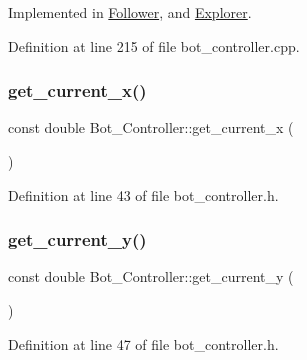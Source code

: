 Implemented in \hyperlink{class_follower_a0af597b7d7f416c37d85be69377d0b58}{Follower}, and \hyperlink{class_explorer_a38e04dc019525baca8530b6cf3e779de}{Explorer}.



Definition at line 215 of file bot\+\_\+controller.\+cpp.

\mbox{\label{class_bot___controller_a2efd33efbb2d3c8caa52e04a049b5971}} 
\subsubsection{\texorpdfstring{get\+\_\+current\+\_\+x()}{get\_current\_x()}}
{\footnotesize\ttfamily const double Bot\+\_\+\+Controller\+::get\+\_\+current\+\_\+x (\begin{DoxyParamCaption}{ }\end{DoxyParamCaption})\hspace{0.3cm}{\ttfamily [inline]}}



Definition at line 43 of file bot\+\_\+controller.\+h.

\mbox{\label{class_bot___controller_a5985b03ff6787846a5abf5cd85ed6ae2}} 
\subsubsection{\texorpdfstring{get\+\_\+current\+\_\+y()}{get\_current\_y()}}
{\footnotesize\ttfamily const double Bot\+\_\+\+Controller\+::get\+\_\+current\+\_\+y (\begin{DoxyParamCaption}{ }\end{DoxyParamCaption})\hspace{0.3cm}{\ttfamily [inline]}}



Definition at line 47 of file bot\+\_\+controller.\+h.

\mbox{\label{class_bot___controller_a5e2f980d71dab69d952c532b5819483b}} 
